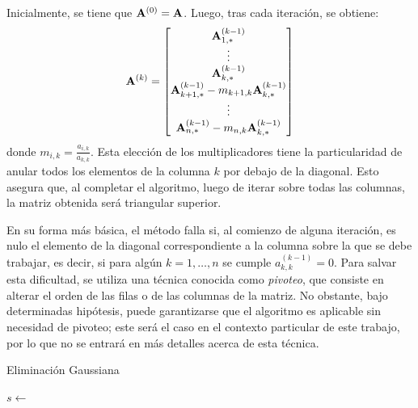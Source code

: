             Inicialmente, se tiene que $\mathbf{A}^{(0)} = \mathbf{A}$. Luego, tras cada iteración, se obtiene:
            \[ \mathbf{A}^{(k)} = \left[ \begin{matrix}
                \mathbf{A}^{(k-1)}_{1,*} \\
                \vdots \\
                \mathbf{A}^{(k-1)}_{k,*} \\
                \mathbf{A}^{(k-1)}_{k+1,*} - m_{k+1,k} \mathbf{A}^{(k-1)}_{k,*} \\
                \vdots \\
                \mathbf{A}^{(k-1)}_{n,*} - m_{n,k} \mathbf{A}^{(k-1)}_{k,*} \\
            \end{matrix} \right] \]
            donde $m_{i,k} = \frac{a_{i,k}}{a_{k,k}}$. Esta elección de los multiplicadores tiene la particularidad de anular todos los elementos de la columna $k$ por debajo de la diagonal. Esto asegura que, al completar el algoritmo, luego de iterar sobre todas las columnas, la matriz obtenida será triangular superior.

            En su forma más básica, el método falla si, al comienzo de alguna iteración, es nulo el elemento de la diagonal correspondiente a la columna sobre la que se debe trabajar, es decir, si para algún $k = 1, \dots, n$ se cumple $a^{(k-1)}_{k,k} = 0$. Para salvar esta dificultad, se utiliza una técnica conocida como \emph{pivoteo}, que consiste en alterar el orden de las filas o de las columnas de la matriz. No obstante, bajo determinadas hipótesis, puede garantizarse que el algoritmo es aplicable sin necesidad de pivoteo; este será el caso en el contexto particular de este trabajo, por lo que no se entrará en más detalles acerca de esta técnica.

            \vspace{.5em}
            \begin{algorithm}[H]
                \caption{Eliminación Gaussiana} \label{alg:gaussian-elimination}
                $s \gets$  \;
            \end{algorithm}
        \vspace{.5em}

